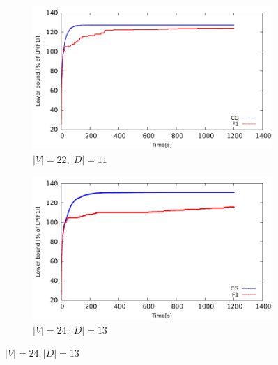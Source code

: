 \begin{figure}[!htb]
    \begin{subfigure}[b]{0.49\textwidth}
        \includegraphics[width=\textwidth]{lower-bound-22-11}
        \caption{$|V|=22, |D|=11$}
        \label{fig:cggr22-11}
    \end{subfigure}
    \hfill %
    \begin{subfigure}[b]{0.49\textwidth}
        \includegraphics[width=\textwidth]{lower-bound-24-12}
        \caption{$|V|=24, |D|=13$}
        \label{fig:cggr24-12}
    \end{subfigure}


\end{figure}
